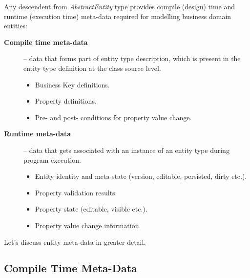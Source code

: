   Any descendent from \emph{AbstractEntity} type provides compile (design) time and runtime (execution time) meta-data required for modelling business domain entities:
  \begin{description}
   \item[\textbf{Compile time meta-data}] -- data that forms part of entity type description, which is present in the entity type definition at the class source level.
      \begin{itemize}
	\item Business Key definitions.
	\item Property definitions.
	\item Pre- and post- conditions for property value change.
      \end{itemize}

   \item[\textbf{Runtime meta-data}] -- data that gets associated with an instance of an entity type during program execution.
      \begin{itemize}
	\item Entity identity and meta-state (version, editable, persisted, dirty etc.).
	\item Property validation results.
	\item Property state (editable, visible etc.).	
	\item Property value change information.	
      \end{itemize}
   \end{description}

  Let's discuss entity meta-data in greater detail.

\subsection{Compile Time Meta-Data}
  
